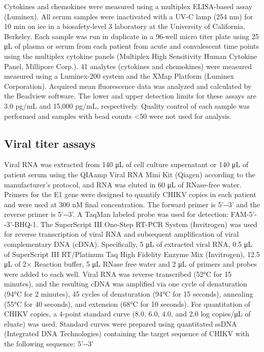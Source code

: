Cytokines and chemokines were measured using a multiplex ELISA-based assay (Luminex). All serum samples were inactivated with a UV-C lamp (254 nm) for 10 min on ice in a biosafety-level 3 laboratory at the University of California, Berkeley. Each sample was run in duplicate in a 96-well micro titer plate using 25 μL of plasma or serum from each patient from acute and convalescent time points using the multiplex cytokine panels (Multiplex High Sensitivity Human Cytokine Panel, Millipore Corp.). 41 analytes (cytokines and chemokines) were measured measured using a Luminex-200 system and the XMap Platform (Luminex Corporation). Acquired mean fluorescence data was analyzed and calculated by the Beadview software. The lower and upper detection limits for these assays are 3.0 pg/mL and 15,000 pg/mL, respectively. Quality control of each sample was performed and samples with bead counts <50 were not used for analysis.  

\subsection{Viral titer assays}

Viral RNA was extracted from 140 μL of cell culture supernatant or 140 μL of patient serum using the QIAamp Viral RNA Mini Kit (Qiagen) according to the manufacturer’s protocol, and RNA was eluted in 60 μL of RNase-free water. Primers for the E1 gene were designed to quantify CHIKV copies in each patient and were used at 300 nM final concentration. The forward primer is 5'-\texttt{}-3' and the reverse primer is 5'-\texttt{}-3'.  A TaqMan labeled probe was used for detection: FAM-5'-\texttt{}-3'-BHQ-1.\autocite{Waggoner2016} The SuperScript III One-Step RT-PCR System (Invitrogen) was used for reverse transcription of viral RNA and subsequent amplification of viral complementary DNA (cDNA). Specifically, 5 μL of extracted viral RNA, 0.5 μL of SuperScript III RT/Platinum Taq High Fidelity Enzyme Mix (Invitrogen), 12.5 μL of 2× Reaction buffer, 5 μL RNase free water and 2 μL of primers and probes were added to each well. Viral RNA was reverse transcribed (52°C for 15 minutes), and the resulting cDNA was amplified via one cycle of denaturation (94°C for 2 minutes), 45 cycles of denaturation (94°C for 15 seconds), annealing (55°C for 40 seconds), and extension (68°C for 10 seconds). For quantitation of CHIKV copies, a 4-point standard curve (8.0, 6.0, 4.0, and 2.0 log copies/μL of eluate) was used. Standard curves were prepared using quantitated ssDNA (Integrated DNA Technologies) containing the target sequence of CHIKV with the following sequence: 5'-\texttt{}-3'

